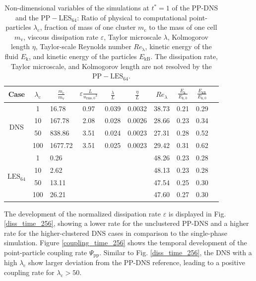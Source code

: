 \documentclass[11pt,a4paper,openany,oneside,parskip=half*]{article}
\begin{document}
\begin{table}[tbp]
	\centering
	\begin{tabular}{| c | c l | c c c c c c c |}
	\hline
	Case & $\lambda_\mathrm{c}$& \multicolumn{1}{c|}{$\frac{m_\mathrm{c}}{m_\mathrm{v}}$} &$\varepsilon \frac{L}{{u_\mathrm{rms,0}}^3}$ & $\frac{\lambda}{L}$ & $\frac{\eta}{L} $ & $Re_\lambda$ & $\frac{E_\mathrm{k}}{E_\mathrm{k,0}}$ & $\frac{E_\mathrm{kB}}{E_\mathrm{k,0}}$ & \\[2pt]
	\hline
	\hline
	\multirow{4}{*}{DNS}
	&1 &16.78 & 0.97& 0.039 & 0.0032 & 38.73 & 0.21 & 0.29 &\\
	&10 &167.78 & 2.08 & 0.028 & 0.0026 & 28.66 & 0.23 & 0.34 &\\
	&50 &838.86 & 3.51 & 0.024 & 0.0023 & 27.31 & 0.28 & 0.52 &\\
	&100 &1677.72 & 3.51 & 0.025 & 0.0023 & 29.42 & 0.31 & 0.62 &\\
	\hline
	\hline
	\multirow{4}{*}{$\mathrm{LES_{64}}$}
	&1 & 0.26 & &  &  & 48.26 & 0.23 & 0.28 &\\
	&10 & 2.62 & &  &  & 48.13 & 0.23 & 0.28 &\\
	&50 & 13.11 & &  &  & 47.54 & 0.25 & 0.30 &\\
	&100 & 26.21 & &  &  & 47.60 & 0.27 & 0.30 &\\
	\hline
	\end{tabular}
	\captionsetup{width=1\linewidth}
	\captionsetup{font=footnotesize}
	\caption{Non-dimensional variables of the simulations at $t^*=1$ of the PP-DNS and the $\mathrm{PP-LES_{64}}$: Ratio of physical to computational point-particles $\lambda_\mathrm{c}$, fraction of mass of one cluster $m_\mathrm{c}$ to the mass of one cell $m_\mathrm{v}$, viscous dissipation rate $\varepsilon$, Taylor microscale $\lambda$, Kolmogorov length $\eta$, Taylor-scale Reynolds number $Re_\mathrm{\lambda}$, kinetic energy of the fluid $E_\mathrm{k}$, and kinetic energy of the particles $E_\mathrm{kB}$. The dissipation rate, Taylor microscale, and Kolmogorov length are not resolved by the $\mathrm{PP-LES_{64}}$.}
	\label{table_values_DNS_LES}
\end{table}%
The development of the normalized dissipation rate $\varepsilon$ is displayed in Fig. \ref{diss_time_256}, showing a lower rate for the unclustered PP-DNS and a higher rate for the higher-clustered DNS cases in comparison to the single-phase simulation.
\newline %
Figure \ref{coupling_time_256} shows the temporal development of the point-particle coupling rate $\Psi_\mathrm{pp}$. Similar to Fig. \ref{diss_time_256}, the DNS with a high $\lambda_\mathrm{c}$ show larger deviation from the PP-DNS reference, leading to a positive coupling rate for $\lambda_\mathrm{c} > 50$.
\end{document}
